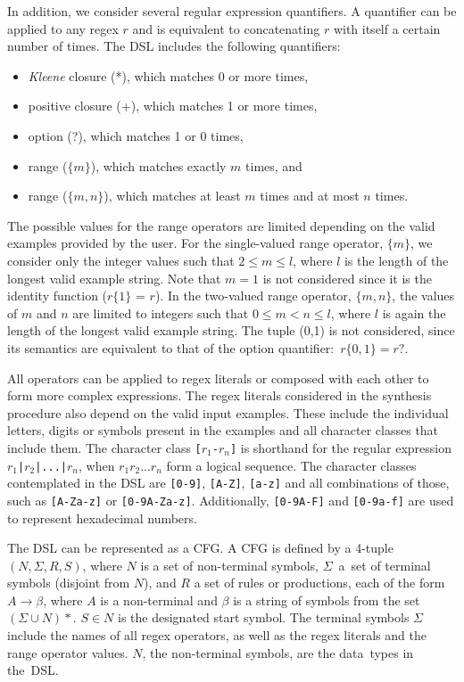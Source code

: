 In addition, we consider several regular expression quantifiers. A quantifier can be applied to any regex \(r\) and is equivalent to concatenating \(r\) with itself a certain number of times. The \ac{DSL} includes the following quantifiers:
\begin{itemize}
    \item \textit{Kleene} closure (*), which matches 0 or more times,
    \item positive closure (+), which matches 1 or more times,
    \item option (?), which matches 1 or 0 times,
    \item range (\(\{m\}\)), which matches exactly \(m\) times, and
    \item range (\(\{m,n\}\)), which matches at least \(m\) times and at most \(n\) times.
\end{itemize}

\noindent
The possible values for the range operators are limited depending on the valid examples provided by the user. For the single-valued range operator, \(\{m\}\), we consider only the integer values such that \(2 \le m \le l\), where \(l\) is the length of the longest valid example string. Note that \(m = 1\) is not considered since it is the identity function (\(r\)\(\{1\}\) = \(r\)).
In the two-valued range operator, \(\{m,n\}\), the values of \(m\) and \(n\) are limited to integers such that \(0 \le m < n \leq l\), where \(l\) is again the length of the longest valid example string. The tuple (0,1) is not considered, since its semantics are equivalent to that of the option quantifier:~\(r\{0,1\} = r?\).


All operators can be applied to regex literals or composed with each other to form more complex expressions.
The regex literals considered in the synthesis procedure also depend on the valid input examples. These include the individual letters, digits or symbols present in the examples and all character classes that include them.
The character class \texttt{[\(r_1\)-\(r_n\)]} is shorthand for the regular expression  \texttt{\(r_1\)|\(r_2\)|...|\(r_n\)}, when \(r_1 r_2 ... r_n\) form a logical sequence.
The character classes contemplated in the DSL are \texttt{[0-9]}, \texttt{[A-Z]}, \texttt{[a-z]} and all combinations of those, such as \texttt{[A-Za-z]} or \texttt{[0-9A-Za-z]}. Additionally, \texttt{[0-9A-F]} and \texttt{[0-9a-f]} are used to represent hexadecimal numbers.

The DSL can be represented as a \ac{CFG}. A \ac{CFG} is defined by a 4-tuple \((N, \Sigma, R, S)\), where \(N\) is a set of non-terminal symbols, \(\Sigma\)~a~set of terminal symbols (disjoint from \(N\)), and \(R\) a set of rules or productions, each of the form \(A \to \beta\), where \(A\) is a non-terminal and \(\beta\) is a string of symbols from the set \((\Sigma \cup N)*\). \(S \in N\) is the designated start symbol.
The terminal symbols \(\Sigma\) include the names of all regex operators, as well as the regex literals and the range operator values.
\(N\), the non-terminal symbols, are the data~types in the~DSL.

